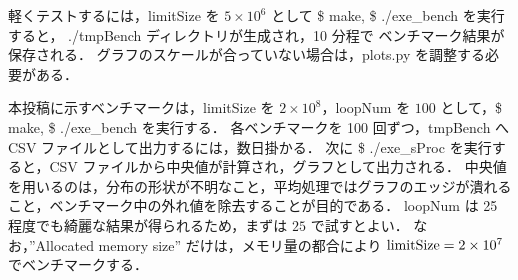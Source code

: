 軽くテストするには，limitSize を $5\times 10^6$ として \$ make, \$ ./exe\_bench を実行すると，
./tmpBench ディレクトリが生成され，10 分程で ベンチマーク結果が保存される．
グラフのスケールが合っていない場合は，plots.py を調整する必要がある．

本投稿に示すベンチマークは，limitSize を $2\times10^8$，loopNum を $100$ として，\$ make, \$ ./exe\_bench を実行する．
各ベンチマークを 100 回ずつ，tmpBench へ CSV ファイルとして出力するには，数日掛かる．
次に \$ ./exe\_sProc を実行すると，CSV ファイルから中央値が計算され，グラフとして出力される．
中央値を用いるのは，分布の形状が不明なこと，平均処理ではグラフのエッジが潰れること，ベンチマーク中の外れ値を除去することが目的である．
loopNum は 25 程度でも綺麗な結果が得られるため，まずは $25$ で試すとよい．
なお，''Allocated memory size'' だけは，メモリ量の都合により ${\rm limitSize}=2\times10^7$ でベンチマークする．





